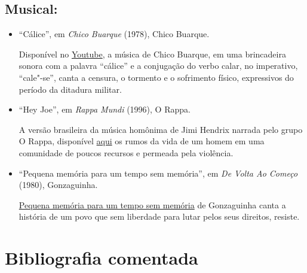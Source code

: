 \documentclass[11pt]{extarticle}
\begin{document}
\subsection{Musical:}

\begin{itemize}
\item``Cálice'', em \emph{Chico Buarque} (1978), Chico Buarque.

Disponível no \href{https://www.youtube.com/watch?v=9y2xB90A0CY&ab_channel=ChicoBuarque-Topic}{Youtube}, a música de Chico Buarque, em uma brincadeira sonora com a palavra ``cálice'' e a conjugação do verbo calar, no imperativo, ``cale"-se'',
canta a censura, o tormento e o sofrimento físico, expressivos do período da ditadura militar.


\item``Hey Joe'', em \emph{Rappa Mundi} (1996), O Rappa.

A versão brasileira da música homônima de Jimi Hendrix narrada pelo grupo O Rappa, disponível \href{https://www.youtube.com/watch?v=4yS9fXaeqss&ab_channel=Leandrocururu}{aqui} os rumos 
da vida de um homem em uma comunidade de poucos recursos e permeada pela violência. 

\item``Pequena memória para um tempo sem memória'', em \emph{De Volta Ao Começo} (1980), Gonzaguinha.

\href{https://www.youtube.com/watch?v=SJ_1pjnW2Lg&ab_channel=fdbb1}{Pequena memória para um tempo sem memória} de Gonzaguinha 
canta a história de um povo que sem liberdade para lutar pelos seus direitos, resiste.

\end{itemize}

\section{Bibliografia comentada}
\end{document}
